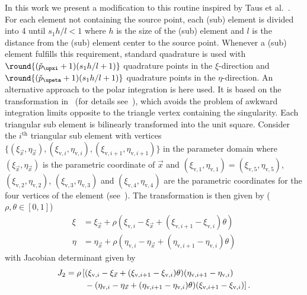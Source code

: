 In this work we present a modification to this routine inspired by Taus et al.~\cite{Taus2016iao,Taus2015iaf}. For each element not containing the source point, each (sub) element is divided into 4 until $s_1 h/l < 1$ where $h$ is the size of the (sub) element and $l$ is the distance from the (sub) element center to the source point. Whenever a (sub) element fulfills this requirement, standard quadrature is used with $\round{(\check{p}_\upxi+1)(s_1 h/l+1)}$ quadrature points in the $\xi$-direction and $\round{(\check{p}_\upeta+1)(s_1 h/l+1)}$ quadrature points in the $\eta$-direction. An alternative approach to the polar integration is here used. It is based on the transformation in~\cite{Duffy1982qoa} (for details see~\cite{Sauter1997qfh}), which avoids the problem of awkward integration limits opposite to the triangle vertex containing the singularity. Each triangular sub element is bilinearly transformed into the unit square. Consider the $i^{\mathrm{th}}$ triangular sub element with vertices $\{(\xi_{\vec{x}},\eta_{\vec{x}}),(\xi_{\mathrm{v},i},\eta_{\mathrm{v},i}),(\xi_{\mathrm{v},i+1},\eta_{\mathrm{v},i+1})\}$ in the parameter domain where $(\xi_{\vec{x}},\eta_{\vec{x}})$ is the parametric coordinate of $\vec{x}$ and $(\xi_{\mathrm{v},1},\eta_{\mathrm{v},1})=(\xi_{\mathrm{v},5},\eta_{\mathrm{v},5})$, $(\xi_{\mathrm{v},2},\eta_{\mathrm{v},2})$, $(\xi_{\mathrm{v},3},\eta_{\mathrm{v},3})$ and $(\xi_{\mathrm{v},4},\eta_{\mathrm{v},4})$ are the parametric coordinates for the four vertices of the element (see~). The transformation is then given by ($\rho,\theta\in[0,1]$)
\begin{equation}
\begin{aligned}
	\xi &= \xi_{\vec{x}} + \rho(\xi_{\mathrm{v},i}-\xi_{\vec{x}}+(\xi_{\mathrm{v},i+1}-\xi_{\mathrm{v},i})\theta)\\
	\eta &= \eta_{\vec{x}} + \rho(\eta_{\mathrm{v},i}-\eta_{\vec{x}}+(\eta_{\mathrm{v},i+1}-\eta_{\mathrm{v},i})\theta)
\end{aligned}
\end{equation}
with Jacobian determinant given by
\begin{align*}
	J_2 &= \rho\left[(\xi_{\mathrm{v},i}-\xi_{\vec{x}} + (\xi_{\mathrm{v},i+1}-\xi_{\mathrm{v},i})\theta)(\eta_{\mathrm{v},i+1}-\eta_{\mathrm{v},i}) \right.\\
	&\left.{\hskip2em\relax} - (\eta_{\mathrm{v},i}-\eta_{\vec{x}} + (\eta_{\mathrm{v},i+1}-\eta_{\mathrm{v},i})\theta)(\xi_{\mathrm{v},i+1}-\xi_{\mathrm{v},i})\right].
\end{align*}
